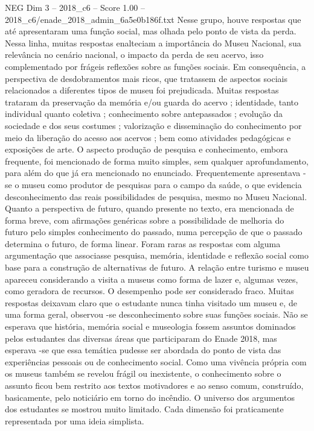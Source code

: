 \begin{textsample}{NEG Dim 3 – 2018\_c6 – Score 1.00 – 2018\_c6/enade\_2018\_admin\_6a5e0b186f.txt}
Nesse grupo, houve respostas que até apresentaram uma função social, mas olhada pelo ponto de vista da perda.
Nessa linha, muitas respostas enalteciam a importância do Museu Nacional, sua relevância no cenário nacional, o impacto da perda de seu acervo, isso complementado por frágeis reflexões sobre as funções sociais.
Em consequência, a perspectiva de desdobramentos mais ricos, que tratassem de aspectos sociais relacionados a diferentes tipos de museu foi prejudicada.
Muitas respostas trataram da preservação da memória e/ou guarda do acervo ; identidade, tanto individual quanto coletiva ; conhecimento sobre antepassados ; evolução da sociedade e dos seus costumes ; valorização e disseminação do conhecimento por meio da liberação do acesso aos acervos ; bem como atividades pedagógicas e exposições de arte.
O aspecto produção de pesquisa e conhecimento, embora frequente, foi mencionado de forma muito simples, sem qualquer aprofundamento, para além do que já era mencionado no enunciado.
Frequentemente apresentava -se o museu como produtor de pesquisas para o campo da saúde, o que evidencia desconhecimento das reais possibilidades de pesquisa, mesmo no Museu Nacional.
Quanto a perspectiva de futuro, quando presente no texto, era mencionada de forma breve, com afirmações genéricas sobre a possibilidade de melhoria do futuro pelo simples conhecimento do passado, numa percepção de que o passado determina o futuro, de forma linear.
Foram raras as respostas com alguma argumentação que associasse pesquisa, memória, identidade e reflexão social como base para a construção de alternativas de futuro.
A relação entre turismo e museu apareceu considerando a visita a museus como forma de lazer e, algumas vezes, como geradora de recursos.
O desempenho pode ser considerado fraco.
Muitas respostas deixavam claro que o estudante nunca tinha visitado um museu e, de uma forma geral, observou -se desconhecimento sobre suas funções sociais.
Não se esperava que história, memória social e museologia fossem assuntos dominados pelos estudantes das diversas áreas que participaram do Enade 2018, mas esperava -se que essa temática pudesse ser abordada do ponto de vista das experiências pessoais ou de conhecimento social.
Como uma vivência própria com os museus também se revelou frágil ou inexistente, o conhecimento sobre o assunto ficou bem restrito aos textos motivadores e ao senso comum, construído, basicamente, pelo noticiário em torno do incêndio.
O universo dos argumentos dos estudantes se mostrou muito limitado.
Cada dimensão foi praticamente representada por uma ideia simplista.

\end{textsample}

